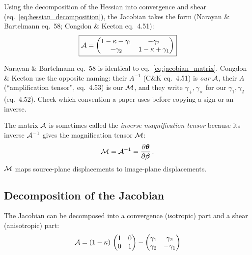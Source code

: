 Using the decomposition of the Hessian into convergence and shear
(eq.~\ref{eq:hessian_decomposition}), the Jacobian takes the
form (Narayan \& Bartelmann eq.~58; Congdon \& Keeton eq.~4.51):
\begin{equation}
    \boxed{
    \mathcal{A} = \begin{pmatrix}
    1 - \kappa - \gamma_1 & -\gamma_2 \\
    -\gamma_2 & 1 - \kappa + \gamma_1
    \end{pmatrix}
    }
    \label{eq:jacobian_matrix}
\end{equation}
\begin{annotation}
Narayan \& Bartelmann eq.~58 is identical to eq.~\eqref{eq:jacobian_matrix}.
Congdon \& Keeton use the opposite naming: their $A^{-1}$ (C\&K eq.~4.51) is
\emph{our} $\mathcal{A}$, their $A$ (``amplification tensor'', eq.~4.53) is our
$\mathcal{M}$, and they write $\gamma_+, \gamma_\times$ for our $\gamma_1, \gamma_2$
(eq.~4.52). Check which convention a paper uses before copying a sign or an
inverse.
\end{annotation}

\begin{remark}
The matrix $\mathcal{A}$ is sometimes called the \emph{inverse
magnification tensor} because its inverse $\mathcal{A}^{-1}$ gives the
magnification tensor $\mathcal{M}$:
\begin{equation}
    \mathcal{M} = \mathcal{A}^{-1}
    = \frac{\partial\boldsymbol{\theta}}{\partial\boldsymbol{\beta}} \,.
    \label{eq:magnification_tensor}
\end{equation}
$\mathcal{M}$ maps source-plane displacements to image-plane displacements.
\end{remark}

\subsection{Decomposition of the Jacobian}

The Jacobian can be decomposed into a convergence (isotropic) part
and a shear (anisotropic) part:
\begin{equation}
    \mathcal{A} = (1 - \kappa)\,
    \begin{pmatrix} 1 & 0 \\ 0 & 1 \end{pmatrix}
    - \begin{pmatrix}
    \gamma_1 & \gamma_2 \\
    \gamma_2 & -\gamma_1
    \end{pmatrix}
    \label{eq:jacobian_decomposition}
\end{equation}

